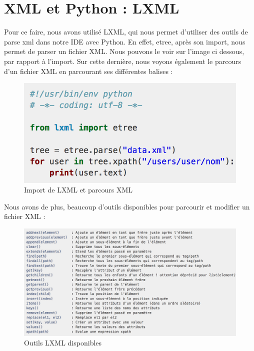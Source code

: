 \documentclass[a4paper,12pt]{article}
\begin{document}
\section{XML et Python : LXML}

Pour ce faire, nous avons utilisé LXML, qui nous permet d'utiliser des outils de parse xml dans notre IDE avec Python. En effet, etree, après son import, nous permet de parser un fichier XML. Nous pouvons le voir sur l'image ci dessous, par rapport à l'import. Sur cette dernière, nous voyons également le parcours d'un fichier XML en parcourant ses différentes balises :

\begin{figure}[h!]
			\begin{center}
				\includegraphics[scale=0.7]{images/etree.png}
				\caption{Import de LXML et parcours XML}
			\end{center}
		\end{figure}
		
Nous avons de plus, beaucoup d'outils disponibles pour parcourir et modifier un fichier XML : 

\begin{figure}[h!]
			\begin{center}
				\includegraphics[scale=0.5]{images/lxml.png}
				\caption{Outils LXML disponibles}
			\end{center}
		\end{figure}
\end{document}
